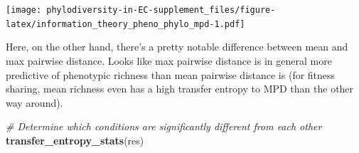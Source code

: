\documentclass[]{book}
\newenvironment{Shaded}{\begin{snugshade}}{\end{snugshade}}
\newcommand{\CommentTok}[1]{\textcolor[rgb]{0.56,0.35,0.01}{\textit{#1}}}
\newcommand{\KeywordTok}[1]{\textcolor[rgb]{0.13,0.29,0.53}{\textbf{#1}}}
\newcommand{\NormalTok}[1]{#1}
\begin{document}
\texttt{[image: phylodiversity-in-EC-supplement\_files/figure-latex/information\_theory\_pheno\_phylo\_mpd-1.pdf]}

Here, on the other hand, there's a pretty notable difference between mean and max pairwise distance. Looks like max pairwise distance is in general more predictive of phenotypic richness than mean pairwise distance is (for fitness sharing, mean richness even has a high transfer entropy to MPD than the other way around).

\begin{Shaded}
\begin{Highlighting}[]
\CommentTok{# Determine which conditions are significantly different from each other}
\KeywordTok{transfer_entropy_stats}\NormalTok{(res)}
\end{Highlighting}
\end{Shaded}
\end{document}
